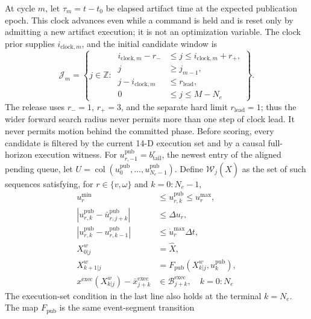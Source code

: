 At cycle $m$, let $\tau_m=t-t_0$ be elapsed artifact time at the expected
publication epoch.  This clock advances even while a command is held and is
reset only by admitting a new artifact execution; it is not an optimization
variable.  The clock prior supplies $i_{\mathrm{clock},m}$, and the initial
candidate window is
\begin{equation}
  \mathcal J_m=\left\{j\in\mathbb Z:\
  \begin{aligned}
    i_{\mathrm{clock},m}-r_-&\le j\le
      i_{\mathrm{clock},m}+r_+,\\
    j&\ge j_{m-1},\\
    j-i_{\mathrm{clock},m}&\le r_{\mathrm{lead}},\\
    0&\le j\le M-N_e
  \end{aligned}
  \right\}.
  \label{eq:phase_candidates}
\end{equation}
The release uses $r_-=1$, $r_+=3$, and the separate hard limit
$r_{\mathrm{lead}}=1$; thus the wider forward search radius never permits more
than one step of clock lead.  It never permits motion
behind the committed phase.  Before scoring, every candidate is filtered by
the current 14-D execution set and by a causal full-horizon execution witness.
For $u^{\mathrm{pub}}_{r,-1}=b^r_{\mathrm{tail}}$, the newest entry of the
aligned pending queue, let
$U=\operatorname{col}(u^{\mathrm{pub}}_0,\ldots,
u^{\mathrm{pub}}_{N_e-1})$.  Define $\mathcal W_j(\widehat X)$ as the set of
such sequences satisfying, for $r\in\{v,\omega\}$ and
$k=0{:}N_e-1$,
\begin{equation}
  \begin{aligned}
    u_r^{\min}&\le u^{\mathrm{pub}}_{r,k}\le u_r^{\max},\\
    |u^{\mathrm{pub}}_{r,k}-\bar u^{\mathrm{pub}}_{r,j+k}|
      &\le\Delta u_r,\\
    |u^{\mathrm{pub}}_{r,k}-u^{\mathrm{pub}}_{r,k-1}|
      &\le\dot u_r^{\max}\Delta t,\\
    X^w_{0|j}&=\widehat X,\\
    X^w_{k+1|j}&=
      F_{\mathrm{pub}}(X^w_{k|j},u^{\mathrm{pub}}_k),\\
    x^{\mathrm{exec}}(X^w_{k|j})-
    \bar x^{\mathrm{exec}}_{j+k}
      &\in\mathcal B^{\mathrm{exec}}_{j+k},\quad k=0{:}N_e
  \end{aligned}
  \label{eq:phase_execution_witness}
\end{equation}
The execution-set condition in the last line also holds at the terminal
$k=N_e$.  The map $F_{\mathrm{pub}}$ is the same event-segment transition
